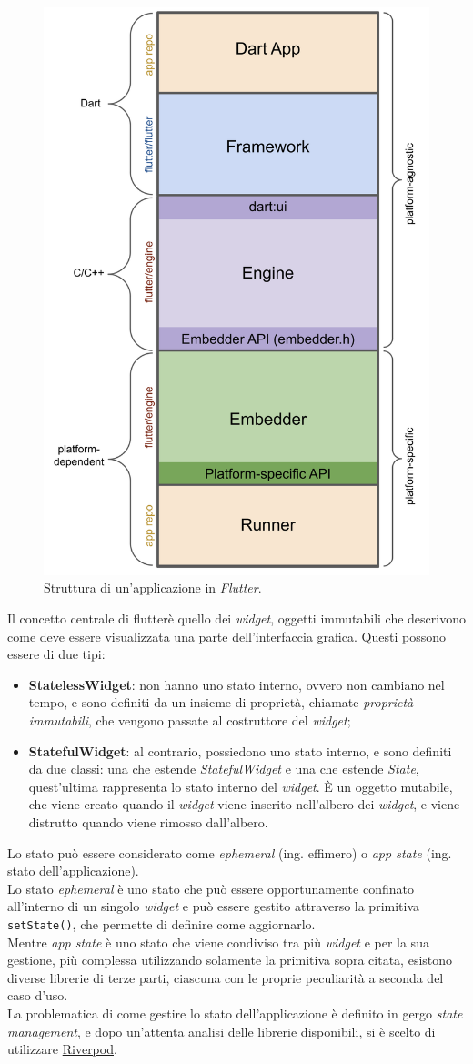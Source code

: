 \begin{figure}[!h] 
    \centering 
    \includegraphics[width=0.4\columnwidth]{images/flutter-app-anatomy.png} 
    \caption{Struttura di un'applicazione in \emph{Flutter}.}
    \label{fig:architettura-flutter}
\end{figure}

Il concetto centrale di \gls{flutter}\glsoccur è quello dei \emph{widget}, oggetti immutabili che descrivono come deve essere visualizzata una parte dell'interfaccia grafica. Questi possono essere di due tipi:
\begin{itemize}
    \item \textbf{StatelessWidget}: non hanno uno stato interno, ovvero non cambiano nel tempo, e sono definiti da un insieme di proprietà, chiamate \emph{proprietà immutabili}, che vengono passate al costruttore del \emph{widget};
    \item \textbf{StatefulWidget}: al contrario, possiedono uno stato interno, e sono definiti da due classi: una che estende \emph{StatefulWidget} e una che estende \emph{State}, quest'ultima rappresenta lo stato interno del \emph{widget}. È un oggetto mutabile, che viene creato quando il \emph{widget} viene inserito nell'albero dei \emph{widget}, e viene distrutto quando viene rimosso dall'albero.
\end{itemize}

Lo stato può essere considerato come \emph{ephemeral} (ing. effimero) o \emph{app state} (ing. stato dell'applicazione). \\
Lo stato \emph{ephemeral} è uno stato che può essere opportunamente confinato all'interno di un singolo \emph{widget} e può essere gestito attraverso la primitiva \lstinline{setState()}, che permette di definire come aggiornarlo.\\
Mentre \emph{app state} è uno stato che viene condiviso tra più \emph{widget} e per la sua gestione, più complessa utilizzando solamente la primitiva sopra citata, esistono diverse librerie di terze parti, ciascuna con le proprie peculiarità a seconda del caso d'uso.\\
\indent La problematica di come gestire lo stato dell'applicazione è definito in gergo \emph{state management}, e dopo un'attenta analisi delle librerie disponibili, si è scelto di utilizzare \href{https://riverpod.dev/}{Riverpod}.\\

